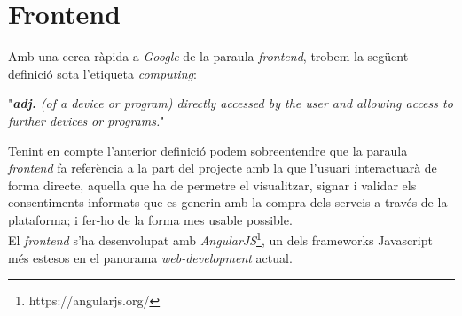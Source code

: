 \section{Frontend}
\label{frontend}
Amb una cerca ràpida a \textit{Google} de la paraula \textit{frontend}, trobem la següent definició sota l'etiqueta \textit{computing}:
\begin{displayquote}
"\textit{\textbf{adj.} (of a device or program) directly accessed by the user and allowing access to further devices or programs.}"
\end{displayquote}
Tenint en compte l'anterior definició podem sobreentendre que la paraula \textit{frontend} fa referència a la part del projecte amb la que l'usuari interactuarà de forma directe, aquella que ha de permetre el visualitzar, signar i validar els consentiments informats que es generin amb la compra dels serveis a través de la plataforma; i fer-ho de la forma mes usable possible.\\
\newline El \textit{frontend} s'ha desenvolupat amb \textit{AngularJS}\footnote{https://angularjs.org/}, un dels frameworks Javascript més estesos en el panorama \textit{web-development} actual.


